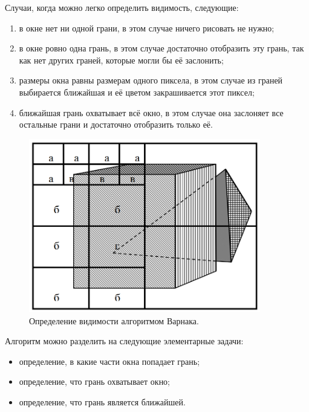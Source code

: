 Случаи, когда можно легко определить видимость, следующие:

\begin{enumerate}
	\item в окне нет ни одной грани, в этом случае ничего рисовать не нужно;
	\item в окне ровно одна грань, в этом случае достаточно отобразить эту
грань, так как нет других граней, которые могли бы её заслонить;
	\item размеры окна равны размерам одного пиксела, в этом случае из
граней выбирается ближайшая и её цветом закрашивается этот
пиксел;
	\item ближайшая грань охватывает всё окно, в этом случае она заслоняет все остальные грани и достаточно отобразить только её. 
\end{enumerate}

\begin{figure}[H]
    \centering
    \includegraphics[width=0.9\textwidth]{img/varnak_algorithm_1.png}
    \caption{Определение видимости алгоритмом Варнака.}
    \label{fig:varnak_algorithm_1}
\end{figure}

Алгоритм можно разделить на следующие элементарные задачи:

\begin{itemize}
	\item определение, в какие части окна попадает грань;
	\item определение, что грань охватывает окно;
	\item определение, что грань является ближайшей.
\end{itemize}

